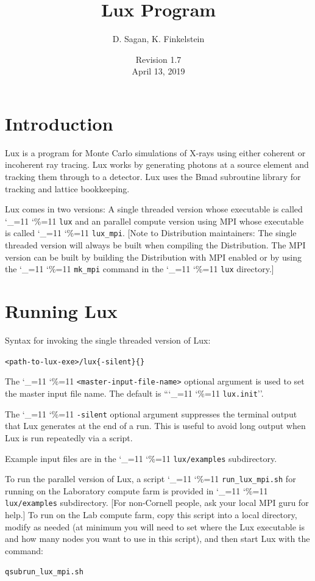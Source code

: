 \documentclass[11pt]{article}
\title{Lux Program}
\author{D. Sagan, K. Finkelstein}
\date{Revision 1.7 \\ April 13, 2019}
\newcommand{\lux}{Lux\xspace}
\newcommand\ttcmd{\begingroup\catcode`\_=11 \catcode`\%=11 \dottcmd}
\newcommand\dottcmd[1]{\texttt{#1}\endgroup}
\newcommand{\vn}{\ttcmd}
\newenvironment{example}
  {\vspace{\ExBeg} \begin{alltt}}
  {\end{alltt} \vspace{\ExEnd}}
\newlength{\ExBeg}
\newlength{\ExEnd}
\begin{document}
\maketitle

\tableofcontents

\section{Introduction} 
\label{s:intro}

\lux is a program for Monte Carlo simulations of X-rays using either coherent or incoherent ray
tracing. \lux works by generating photons at a source element and tracking them through to a
detector. \lux uses the Bmad subroutine library\cite{b:bmad} for tracking and lattice bookkeeping.

\lux comes in two versions: A single threaded version whose executable is called \vn{lux} and an
parallel compute version using MPI whose executable is called \vn{lux_mpi}. [Note to Distribution
maintainers: The single threaded version will always be built when compiling the Distribution. The
MPI version can be built by building the Distribution with MPI enabled or by using the
\vn{mk_mpi} command in the \vn{lux} directory.]

\section{Running \lux} 
\label{s:run}

Syntax for invoking the single threaded version of \lux:
\begin{example}
 <path-to-lux-exe>/lux \{-silent\} \{<master-input-file-name>\}
\end{example}
The \vn{<master-input-file-name>} optional argument is used to set the
master input file name. The default is ``\vn{lux.init}''. 

The \vn{-silent} optional argument suppresses the terminal output that
\lux generates at the end of a run. This is useful to avoid long
output when \lux is run repeatedly via a script.

Example input files are in the \vn{lux/examples} subdirectory.

To run the parallel version of \lux, a script \vn{run_lux_mpi.sh} for
running on the Laboratory compute farm is provided in
\vn{lux/examples} subdirectory. [For non-Cornell people, ask your
local MPI guru for help.] To run on the Lab compute farm, copy this
script into a local directory, modify as needed (at minimum you will
need to set where the \lux executable is and how many nodes you want
to use in this script), and then start \lux with the command:
\begin{example}
  qsub run_lux_mpi.sh
\end{example}
\end{document}
